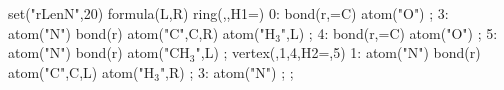 \documentclass{article}
\begin{document}
\begin{chemistry}
  set("rLenN",20)
  formula(L,R)
    {
      ring(,,H1=)
        {
          0: bond(r,=C) atom("O") ;
          3: atom("N") bond(r) atom("C",C,R) atom("H$_3$",L) ;
          4: bond(r,=C) atom("O") ;
          5: atom("N") bond(r) atom("CH$_3$",L) ;
          vertex(,1,4,H2=,5)
            {
              1: atom("N") bond(r) atom("C",C,L) atom("H$_3$",R) ;
              3: atom("N") ;
            } ;
        }
    }
\end{chemistry}
\end{document}
